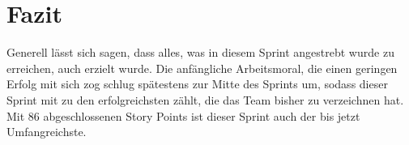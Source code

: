 \documentclass[12pt,a4paper, oneside]{article}
\begin{document}
\section{Fazit}
Generell lässt sich sagen, dass alles, was in diesem Sprint angestrebt wurde zu erreichen, auch erzielt wurde. Die anfängliche Arbeitsmoral, die einen geringen Erfolg mit sich zog schlug spätestens zur Mitte des Sprints um, sodass dieser Sprint mit zu den erfolgreichsten zählt, die das Team bisher zu verzeichnen hat. Mit 86 abgeschlossenen Story Points ist dieser Sprint auch der bis jetzt Umfangreichste.
\end{document}
